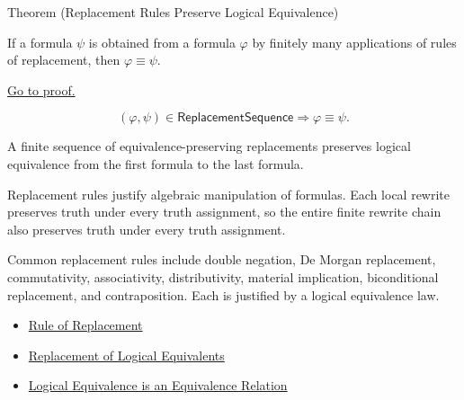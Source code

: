 \begin{theorembox}{Theorem (Replacement Rules Preserve Logical Equivalence)}
\begin{theorem}
\label{thm:replacement-rules-preserve-logical-equivalence-propositional-logic}
If a formula \(\psi\) is obtained from a formula \(\varphi\) by finitely many
applications of rules of replacement, then \(\varphi\equiv\psi\).

\noindent\hyperref[prf:replacement-rules-preserve-logical-equivalence-propositional-logic]{Go to proof.}
\end{theorem}
\end{theorembox}

\begin{remark*}
\[
(\varphi,\psi)\in\mathsf{ReplacementSequence}
\Longrightarrow
\varphi\equiv\psi.
\]
\end{remark*}



\begin{remark*}[Interpretation]
A finite sequence of equivalence-preserving replacements preserves logical
equivalence from the first formula to the last formula.

Replacement rules justify algebraic manipulation of formulas. Each local rewrite
preserves truth under every truth assignment, so the entire finite rewrite chain
also preserves truth under every truth assignment.
\end{remark*}

\begin{remark*}[Exposition]
Common replacement rules include double negation, De Morgan replacement,
commutativity, associativity, distributivity, material implication, biconditional
replacement, and contraposition. Each is justified by a logical equivalence law.
\end{remark*}

\begin{dependencies}
\begin{itemize}
  \item \hyperref[def:rule-of-replacement-propositional-logic]{Rule of Replacement}
  \item \hyperref[thm:replacement-of-logical-equivalents-propositional-logic]{Replacement of Logical Equivalents}
  \item \hyperref[thm:logical-equivalence-equivalence-relation]{Logical Equivalence is an Equivalence Relation}
\end{itemize}
\end{dependencies}
